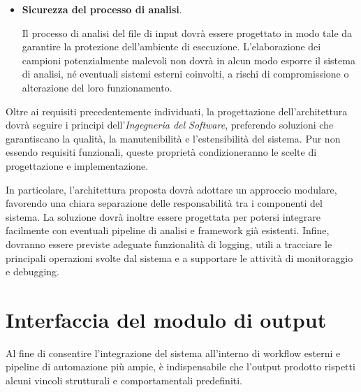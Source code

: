 \begin{description}
\begin{itemize}
        Il modulo prodotto dal sistema dovrà avere esclusivamente finalità difensive e dovrà limitarsi a intercettare passivamente le comunicazioni provenienti dal server C2. Le funzionalità implementate dovranno essere circoscritte alla gestione della connessione e alle fasi di ricezione, decodifica, parsing e classificazione dei messaggi ricevuto. Non dovranno essere inclusi comportamenti offensivi, né meccanismi volti a eseguire attacchi o altre azioni malevole. Le uniche comunicazioni attive consentite saranno quelle strettamente necessarie all'instaurazione e al mantenimento della sessione con il server C2.
        
        \item \textbf{Sicurezza del processo di analisi}.
        
        Il processo di analisi del file di input dovrà essere progettato in modo tale da garantire la protezione dell'ambiente di esecuzione. L'elaborazione dei campioni potenzialmente malevoli non dovrà in alcun modo esporre il sistema di analisi, né eventuali sistemi esterni coinvolti, a rischi di compromissione o alterazione del loro funzionamento.
    \end{itemize}

\end{description}

Oltre ai requisiti precedentemente individuati, la progettazione dell'architettura dovrà seguire i principi dell'\textit{Ingegneria del Software}, preferendo soluzioni che garantiscano la qualità, la manutenibilità e l'estensibilità del sistema. Pur non essendo requisiti funzionali, queste proprietà condizioneranno le scelte di progettazione e implementazione.

In particolare, l'architettura proposta dovrà adottare un approccio modulare, favorendo una chiara separazione delle responsabilità tra i componenti del sistema. La soluzione dovrà inoltre essere progettata per potersi integrare facilmente con eventuali pipeline di analisi e framework già esistenti. Infine, dovranno essere previste adeguate funzionalità di logging, utili a tracciare le principali operazioni svolte dal sistema e a supportare le attività di monitoraggio e debugging.

\section{Interfaccia del modulo di output} %

Al fine di consentire l'integrazione del sistema all'interno di workflow esterni e pipeline di automazione più ampie, è indispensabile che l'output prodotto rispetti alcuni vincoli strutturali e comportamentali predefiniti.

